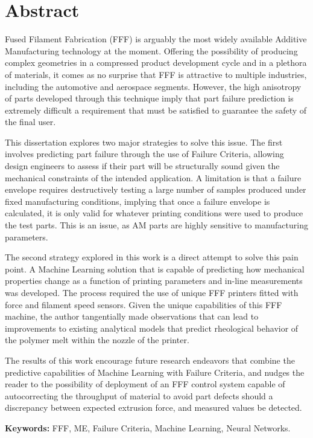 \documentclass[main.tex]{subfiles}
\begin{document}
\setcounter{page}{1}
\chapter*{Abstract}
Fused Filament Fabrication (FFF) is arguably the most widely available Additive Manufacturing technology at the moment. Offering the possibility of producing complex geometries in a compressed product development cycle and in a plethora of materials, it comes as no surprise that FFF is attractive to multiple industries, including the automotive and aerospace segments. However, the high anisotropy of parts developed through this technique imply that part failure prediction is extremely difficult \textemdash a requirement that must be satisfied to guarantee the safety of the final user.

This dissertation explores two major strategies to solve this issue. The first involves predicting part failure through the use of Failure Criteria, allowing design engineers to assess if their part will be structurally sound given the mechanical constraints of the intended application. A limitation is that a failure envelope requires destructively testing a large number of samples produced under fixed manufacturing conditions, implying that once a failure envelope is calculated, it is only valid for whatever printing conditions were used to produce the test parts. This is an issue, as AM parts are highly sensitive to manufacturing parameters. 

The second strategy explored in this work is a direct attempt to solve this pain point. A Machine Learning solution that is capable of predicting how mechanical properties change as a function of printing parameters and in-line measurements was developed. The process required the use of unique FFF printers fitted with force and filament speed sensors. Given the unique capabilities of this FFF machine, the author tangentially made observations that can lead to improvements to existing analytical models that predict rheological behavior of the polymer melt within the nozzle of the printer. 

The results of this work encourage future research endeavors that combine the predictive capabilities of Machine Learning with Failure Criteria, and nudges the reader to the possibility of deployment of an FFF control system capable of autocorrecting the throughput of material to avoid part defects should a discrepancy between expected extrusion force, and measured values be detected.  
 
\vspace{10mm} %
\textbf{Keywords:} FFF, ME, Failure Criteria, Machine Learning, Neural Networks.
\end{document}
